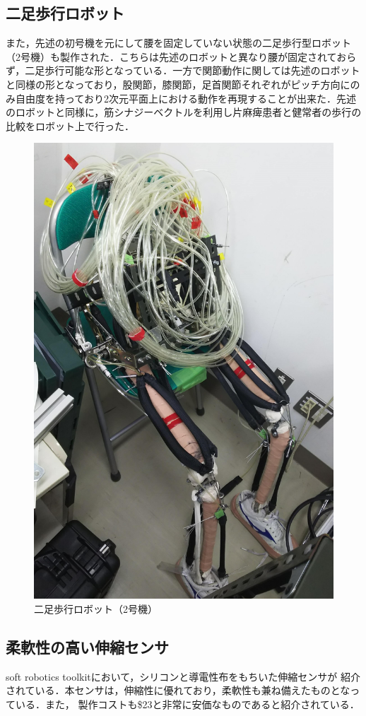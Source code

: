 \subsection{二足歩行ロボット}
また，先述の初号機を元にして腰を固定していない状態の二足歩行型ロボット（2号機）も製作された．こちらは先述のロボットと異なり腰が固定されておらず，二足歩行可能な形となっている．一方で関節動作に関しては先述のロボットと同様の形となっており，股関節，膝関節，足首関節それぞれがピッチ方向にのみ自由度を持っており2次元平面上における動作を再現することが出来た．先述のロボットと同様に，筋シナジーベクトルを利用し片麻痺患者と健常者の歩行の比較をロボット上で行った．
\begin{figure}[h]
  \begin{center}
  \includegraphics[width=0.35\columnwidth,clip,bb=0 0 1540 2340]{Photo/1.緒言/2nd.JPG}
  \caption{二足歩行ロボット（2号機）}
  \label{2号機}
 \end{center}
\end{figure}

\subsection{柔軟性の高い伸縮センサ}%
soft robotics toolkit\cite{MITSoftRobot}において，シリコンと導電性布をもちいた伸縮センサが
紹介されている．本センサは，伸縮性に優れており，柔軟性も兼ね備えたものとなっている．また，
製作コストも\$23と非常に安価なものであると紹介されている．

